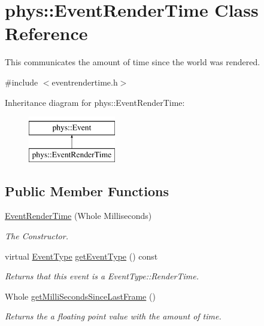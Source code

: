 \hypertarget{classphys_1_1EventRenderTime}{
\section{phys::EventRenderTime Class Reference}
\label{d3/d8b/classphys_1_1EventRenderTime}
}


This communicates the amount of time since the world was rendered.  




{\ttfamily \#include $<$eventrendertime.h$>$}

Inheritance diagram for phys::EventRenderTime:\begin{figure}[H]
\begin{center}
\leavevmode
\includegraphics[height=2cm]{d3/d8b/classphys_1_1EventRenderTime}
\end{center}
\end{figure}
\subsection*{Public Member Functions}
\begin{DoxyCompactItemize}
\item 
\hyperlink{classphys_1_1EventRenderTime_af2384f7b09bbea42dcd2539a9e1747fd}{EventRenderTime} (Whole Milliseconds)
\begin{DoxyCompactList}\small\item\em The Constructor. \item\end{DoxyCompactList}\item 
virtual \hyperlink{classphys_1_1Event_af5fdbb3e08d8e578d58770fbc606fda7}{EventType} \hyperlink{classphys_1_1EventRenderTime_a66918bf3793196899621e4442a6f7a57}{getEventType} () const 
\begin{DoxyCompactList}\small\item\em Returns that this event is a EventType::RenderTime. \item\end{DoxyCompactList}\item 
Whole \hyperlink{classphys_1_1EventRenderTime_ac9f20f13bf1f6e542151be2ce8ea2fa4}{getMilliSecondsSinceLastFrame} ()
\begin{DoxyCompactList}\small\item\em Returns the a floating point value with the amount of time. \item\end{DoxyCompactList}\end{DoxyCompactItemize}



